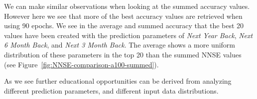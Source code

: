\documentclass[utf8]{FrontiersinVancouver} %
\begin{document}
We can make similar observations when looking at the summed accuracy values. However here we see that more of the best accuracy values are retrieved when using 90 epochs.  We see in the average and summed accuracy that the best 20 values have been created with the prediction parameters of {\em Next Year Back}, {\em Next 6 Month Back}, and {\em
  Next 3 Month Back}. The average shows a more uniform distribution of
these parameters in the top 20 than the summed NNSE values (see
Figure~\ref{fig:NNSE-comparison-a100-summed}).

As we see further educational opportunities can be derived from analyzing different prediction parameters, and different input data distributions.

\begin{figure}[p]

\end{figure}
\end{document}
